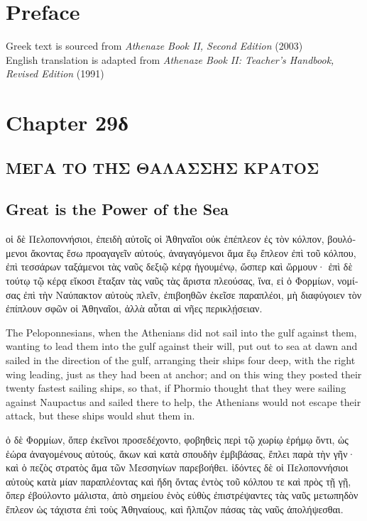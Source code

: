 \documentclass{article}
\begin{document}
\section{Preface}

Greek text is sourced from \emph{Athenaze Book II, Second Edition} (2003) \\
English translation is adapted from \emph{Athenaze Book II: Teacher's Handbook, Revised Edition} (1991)

\section{Chapter 29\textgreek{δ}}

\subsection*{\textgreek{ΜΕΓΑ ΤΟ ΤΗΣ ΘΑΛΑΣΣΗΣ ΚΡΑΤΟΣ}}
\subsection*{Great is the Power of the Sea}

\begin{greek}
οἱ δὲ Πελοποννήσιοι, ἐπειδὴ αὐτοῖς οἱ Ἀθηναῖοι οὐκ ἐπέπλεον ἐς τὸν κόλπον,
βουλόμενοι ἄκοντας ἔσω προαγαγεῖν αὐτούς, ἀναγαγόμενοι ἅμα ἕῳ ἔπλεον ἐπὶ τοῦ κόλπου,
ἐπὶ τεσσάρων ταξάμενοι τὰς ναῦς δεξιῷ κέρᾳ ἡγουμένῳ, ὥσπερ καὶ ὥρμουν·
ἐπὶ δὲ τούτῳ τῷ κέρᾳ εἴκοσι ἔταξαν τὰς ναῦς τὰς ἄριστα πλεούσας,
ἵνα, εἰ ὁ Φορμίων, νομίσας ἐπὶ τὴν Ναύπακτον αὐτοὺς πλεῖν, ἐπιβοηθῶν ἐκεῖσε παραπλέοι,
μὴ διαφύγοιεν τὸν ἐπίπλουν σφῶν οἱ Ἀθηναῖοι, ἀλλὰ αὗται αἱ νῆες περικλῄσειαν. \\
\end{greek}


The Peloponnesians, when the Athenians did not sail into the gulf against them,
wanting to lead them into the gulf against their will, put out to sea at dawn
and sailed in the direction of the gulf, arranging their ships four deep, with the right wing leading,
just as they had been at anchor; and on this wing they posted their twenty fastest sailing ships,
so that, if Phormio thought that they were sailing against Naupactus and sailed there to help,
the Athenians would not escape their attack, but these ships would shut them in. \\


\begin{greek}
ὁ δὲ Φορμίων, ὅπερ ἐκεῖνοι προσεδέχοντο, φοβηθεὶς περὶ τῷ χωρίῳ ἐρήμῳ ὄντι,
ὡς ἑώρα ἀναγομένους αὐτούς, ἄκων καὶ κατὰ σπουδὴν ἐμβιβάσας, ἔπλει παρὰ τὴν γῆν·
καὶ ὁ πεζὸς στρατὸς ἅμα τῶν Μεσσηνίων παρεβοήθει.
ἰδόντες δὲ οἱ Πελοποννήσιοι αὐτοὺς κατὰ μίαν παραπλέοντας
καὶ ἤδη ὄντας ἐντὸς τοῦ κόλπου τε καὶ πρὸς τῇ γῇ, ὅπερ ἐβούλοντο μάλιστα,
ἀπὸ σημείου ἑνὸς εὐθὺς ἐπιστρέψαντες τὰς ναῦς μετωπηδὸν ἔπλεον ὡς τάχιστα ἐπὶ τοὺς Ἀθηναίους,
καὶ ἤλπιζον πάσας τὰς ναῦς ἀπολήψεσθαι. \\
\end{greek}
\end{document}
